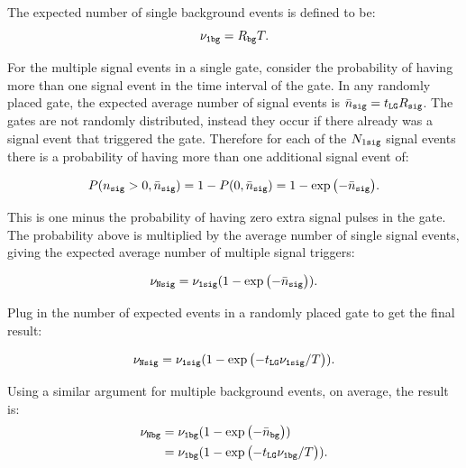 \documentclass[letter,twocolumn,preprint,3p,numbers,sort&compress]{elsarticle}
\begin{document}
The expected number of single background events is defined to be:
\begin{equation} \label{eq:1bg}
\nu_{\tt 1 bg} = R_{\tt bg} T.
\end{equation}

For the multiple signal events in a single gate, consider the
probability of having more than one signal event in the time interval
of the gate.  In any randomly placed gate, the expected average number
of signal events is $\bar{ n }_{\tt sig} = t_{\tt LG} R_{\tt sig}$.
The gates are not randomly distributed, instead they occur if there
already was a signal event that triggered the gate.  Therefore for
each of the $N_{1\tt sig}$ signal events there is a probability of
having more than one additional signal event of:

\begin{equation*}
P( n_{\tt sig} > 0 , \bar{n}_{\tt sig} ) = 1 - P( 0, \bar{n}_{\tt sig} ) = 1 - \exp{ \left( -\bar{n}_{\tt sig} \right) } . 
\end{equation*}

This is one minus the probability of having zero extra signal pulses
in the gate.  The probability above is multiplied by the average
number of single signal events, giving the expected average number of
multiple signal triggers:

\begin{equation*}
\nu_{\tt N sig} = \nu_{\tt 1 sig} ( 1 - \exp{ \left( -\bar{n}_{\tt sig} \right) } ) .
\end{equation*}

Plug in the number of expected events in a randomly placed gate to get
the final result:

\begin{equation} \label{eq:Nsig} 
\nu_{\tt N sig} = \nu_{\tt 1 sig} ( 1 - \exp{ \left( -t_{\tt LG} \nu_{\tt 1 sig} / T \right) } ) .  
\end{equation}

Using a similar argument for multiple background events, on average,
the result is:
\begin{align}\label{eq:Nbg}
\nu_{\tt N bg} &= \nu_{\tt 1 bg} ( 1 - \exp{ \left( -\bar{n}_{\tt bg} \right) } ) \nonumber \\
             &=  \nu_{\tt 1 bg} ( 1 - \exp{ \left( -t_{\tt LG} \nu_{\tt 1 bg} / T \right) } ).  
\end{align}
\end{document}

